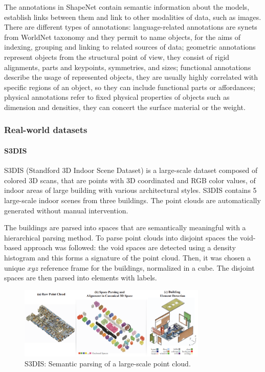 The annotations in ShapeNet contain semantic information about the models, establish links between them and link to other modalities of data, such as images. There are different types of annotations: language-related annotations are synets from WorldNet taxonomy and they permit to name objects, for the aims of indexing, grouping and linking to related sources of data; geometric annotations represent objects from the structural point of view, they consist of rigid alignments, parts and keypoints, symmetries, and sizes; functional annotations describe the usage of represented objects, they are usually highly correlated with specific regions of an object, so they can include functional parts or affordances; physical annotations refer to fixed physical properties of objects such as dimension and densities, they can concert the surface material or the weight.

\subsubsection{Real-world datasets}

\paragraph{S3DIS~\cite{s3dis}}

S3DIS (Standford 3D Indoor Scene Dataset) is a large-scale dataset composed of colored 3D scans, that are points with 3D coordinated and RGB color values, of indoor areas of large building with various architectural styles. S3DIS contains 5 large-scale indoor scenes from three buildings. The point clouds are automatically generated without manual intervention.

The buildings are parsed into spaces that are semantically meaningful with a hierarchical parsing method. To parse point clouds into disjoint spaces the void-based approach was followed: the void spaces are detected using a density histogram and this forms a signature of the point cloud. Then, it was chosen a unique $xyz$ reference frame for the buildings, normalized in a cube. The disjoint spaces are then parsed into elements with labels.

\begin{figure}[ht]
    \centering
    \includegraphics[width=0.8\textwidth]{images/s3dis.png}
    \caption{S3DIS: Semantic parsing of a large-scale point cloud.}
    \label{fig:s3dis}
\end{figure}

